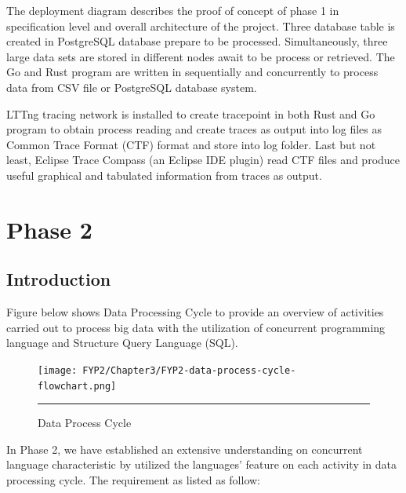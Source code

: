 The deployment diagram describes the proof of concept of phase 1 in specification level and overall architecture of the project. Three database table is created in PostgreSQL database prepare to be processed. Simultaneously, three large data sets are stored in different nodes await to be process or retrieved. The Go and Rust program are written in sequentially and concurrently to process data from CSV file or PostgreSQL database system.

LTTng tracing network is installed to create tracepoint in both Rust and Go program to obtain process reading and create traces as output into log files as Common Trace Format (CTF) format and store into log folder. Last but not least, Eclipse Trace Compass (an Eclipse IDE plugin) read CTF files and produce useful graphical and tabulated information from traces as output.

\section{Phase 2}

\subsection{Introduction}

Figure below shows Data Processing Cycle to provide an overview of activities carried out to process big data with the utilization of concurrent programming language and Structure Query Language (SQL).

\begin{figure}[H]
	\centering
	\texttt{[image: FYP2/Chapter3/FYP2-data-process-cycle-flowchart.png]}
	\rule{35em}{0.5pt}
	\caption[Data Process Cycle]{Data Process Cycle}
\end{figure} 

In Phase 2, we have established an extensive understanding on concurrent language characteristic by utilized the languages' feature on each activity in data processing cycle. The requirement as listed as follow: 

